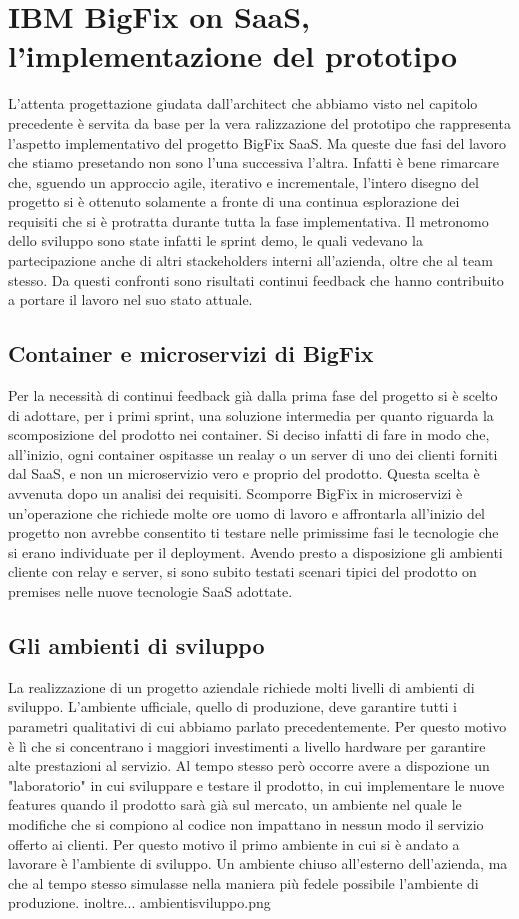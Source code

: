 \chapter{IBM BigFix on SaaS, l'implementazione del prototipo}
L'attenta progettazione giudata dall'architect che abbiamo visto nel capitolo precedente è servita da base per la vera ralizzazione del prototipo che rappresenta l'aspetto implementativo del progetto BigFix SaaS. Ma queste due fasi del lavoro che stiamo presetando non sono l'una successiva l'altra. Infatti è bene rimarcare che, sguendo un approccio agile, iterativo e incrementale, l'intero disegno del progetto si è ottenuto solamente a fronte di una continua esplorazione dei requisiti che si è protratta durante tutta la fase implementativa. Il metronomo dello sviluppo sono state infatti le sprint demo, le quali vedevano la partecipazione anche di altri stackeholders interni all'azienda, oltre che al team stesso. Da questi confronti sono risultati continui feedback che hanno contribuito a portare il lavoro nel suo stato attuale.

\section{Container e microservizi di BigFix}
Per la necessità di continui feedback già dalla prima fase del progetto si è scelto di adottare, per i primi sprint, una soluzione intermedia per quanto riguarda la scomposizione del prodotto nei container. Si deciso infatti di fare in modo che, all'inizio, ogni container ospitasse un realay o un server di uno dei clienti forniti dal SaaS, e non un microservizio vero e proprio del prodotto. Questa scelta è avvenuta dopo un analisi dei requisiti. Scomporre BigFix in microservizi è un'operazione che richiede molte ore uomo di lavoro e affrontarla all'inizio del progetto non avrebbe consentito ti testare nelle primissime fasi le tecnologie che si erano individuate per il deployment. Avendo presto a disposizione gli ambienti cliente con relay e server, si sono subito testati scenari tipici del prodotto on premises nelle nuove tecnologie SaaS adottate.

\section{Gli ambienti di sviluppo }
La realizzazione di un progetto aziendale richiede molti livelli di ambienti di sviluppo. L'ambiente ufficiale, quello di produzione, deve garantire tutti i parametri qualitativi di cui abbiamo parlato precedentemente. Per questo motivo è lì che si concentrano i maggiori investimenti a livello hardware per garantire alte prestazioni al servizio. Al tempo stesso però occorre avere a dispozione un "laboratorio" in cui sviluppare e testare il prodotto, in cui implementare le nuove features quando il prodotto sarà già sul mercato, un ambiente nel quale le modifiche che si compiono al codice non impattano in nessun modo il servizio offerto ai clienti. Per questo motivo il primo ambiente in cui si è andato a lavorare è l'ambiente di sviluppo. Un ambiente chiuso all'esterno dell'azienda, ma che al tempo stesso simulasse nella maniera più fedele possibile l'ambiente di produzione. inoltre...
ambientisviluppo.png
